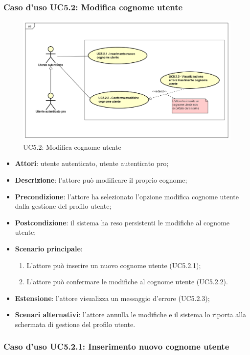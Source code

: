 \subsubsection{Caso d'uso UC5.2: Modifica cognome utente}
\label{UC5.2}
\begin{figure}[h]
	\centering
	\includegraphics[scale=0.5,keepaspectratio]{UML/UC5_2.png}
	\caption{UC5.2: Modifica cognome utente}
\end{figure}
\begin{itemize}
	\item \textbf{Attori}: utente autenticato, utente autenticato pro;
	\item \textbf{Descrizione}: l'attore può modificare il proprio cognome;
	\item \textbf{Precondizione}: l'attore ha selezionato l'opzione modifica cognome utente dalla gestione del profilo utente; 
	\item \textbf{Postcondizione}: il sistema ha reso persistenti le modifiche al cognome utente;
	\item \textbf{Scenario principale}:
	\begin{enumerate}
		\item L'attore può inserire un nuovo cognome utente (UC5.2.1);
		\item L'attore può confermare le modifiche al cognome utente (UC5.2.2).
	\end{enumerate}
	\item \textbf{Estensione}: l'attore visualizza un messaggio d'errore (UC5.2.3);
	\item \textbf{Scenari alternativi}: l'attore annulla le modifiche e il sistema lo riporta alla schermata di gestione del profilo utente.
\end{itemize}

\subsubsection{Caso d'uso UC5.2.1: Inserimento nuovo cognome utente}


